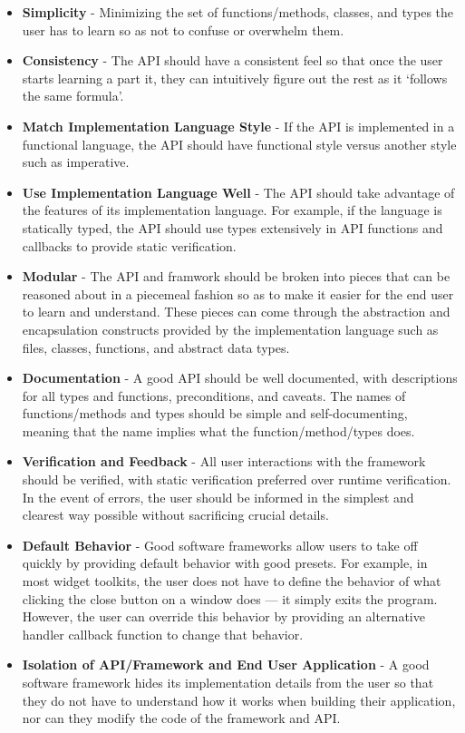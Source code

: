 \begin{itemize}
\item \textbf{Simplicity} - Minimizing the set of functions/methods, classes, and types the user has to learn so as not to confuse or overwhelm them.
\item \textbf{Consistency} - The API should have a consistent feel so that once the user starts learning a part it, they can intuitively figure out the rest as it `follows the same formula'.
\item \textbf{Match Implementation Language Style} - If the API is implemented in a functional language, the API should have functional style versus another style such as imperative.
\item \textbf{Use Implementation Language Well} - The API should take advantage of the features of its implementation language. For example, if the language is statically typed, the API should use types extensively in API functions and callbacks to provide static verification.
\item \textbf{Modular} - The API and framwork should be broken into pieces that can be reasoned about in a piecemeal fashion so as to make it easier for the end user to learn and understand. These pieces can come through the abstraction and encapsulation constructs provided by the implementation language such as files, classes, functions, and abstract data types.
\item \textbf{Documentation} - A good API should be well documented, with descriptions for all types and functions, preconditions, and caveats. The names of functions/methods and types should be simple and self-documenting, meaning that the name implies what the function/method/types does.
\item \textbf{Verification and Feedback} - All user interactions with the framework should be verified, with static verification preferred over runtime verification. In the event of errors, the user should be informed in the simplest and clearest way possible without sacrificing crucial details.
\item \textbf{Default Behavior} - Good software frameworks allow users to take off quickly by providing default behavior with good presets. For example, in most widget toolkits, the user does not have to define the behavior of what clicking the close button on a window does --- it simply exits the program. However, the user can override this behavior by providing an alternative handler callback function to change that behavior.
\item \textbf{Isolation of API/Framework and End User Application} - A good software framework hides its implementation details from the user so that they do not have to understand how it works when building their application, nor can they modify the code of the framework and API.
\end{itemize}

